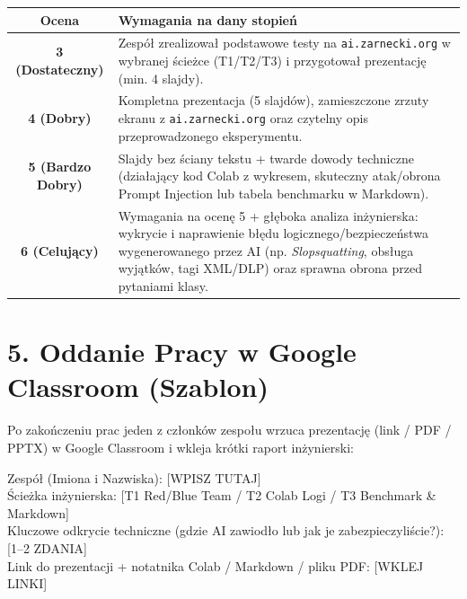 \documentclass[11pt,a4paper]{article}
\begin{document}
\begin{center}
\begin{tabularx}{\textwidth}{@{} c X @{}}
\toprule
\textbf{Ocena} & \textbf{Wymagania na dany stopień} \\
\midrule
\textbf{3 (Dostateczny)} & Zespół zrealizował podstawowe testy na \texttt{ai.zarnecki.org} w wybranej ścieżce (T1/T2/T3) i przygotował prezentację (min. 4 slajdy). \\
\midrule
\textbf{4 (Dobry)} & Kompletna prezentacja (5 slajdów), zamieszczone zrzuty ekranu z \texttt{ai.zarnecki.org} oraz czytelny opis przeprowadzonego eksperymentu. \\
\midrule
\textbf{5 (Bardzo Dobry)} & Slajdy bez ściany tekstu + twarde dowody techniczne (działający kod Colab z wykresem, skuteczny atak/obrona Prompt Injection lub tabela benchmarku w Markdown). \\
\midrule
\textbf{6 (Celujący)} & Wymagania na ocenę 5 + głęboka analiza inżynierska: wykrycie i naprawienie błędu logicznego/bezpieczeństwa wygenerowanego przez AI (np. \emph{Slopsquatting}, obsługa wyjątków, tagi XML/DLP) oraz sprawna obrona przed pytaniami klasy. \\
\bottomrule
\end{tabularx}
\end{center}

\section{5. Oddanie Pracy w Google Classroom (Szablon)}

Po zakończeniu prac jeden z członków zespołu wrzuca prezentację (link / PDF / PPTX) w Google Classroom i wkleja krótki raport inżynierski:

\begin{tcolorbox}[colback=gray!6!white, colframe=gray!50!black, boxrule=0.6pt, arc=2pt]
\ttfamily\small
Zespół (Imiona i Nazwiska): [WPISZ TUTAJ]\\
Ścieżka inżynierska: [T1 Red/Blue Team / T2 Colab Logi / T3 Benchmark \& Markdown]\\
Kluczowe odkrycie techniczne (gdzie AI zawiodło lub jak je zabezpieczyliście?): [1--2 ZDANIA]\\
Link do prezentacji + notatnika Colab / Markdown / pliku PDF: [WKLEJ LINKI]
\end{tcolorbox}
\end{document}
